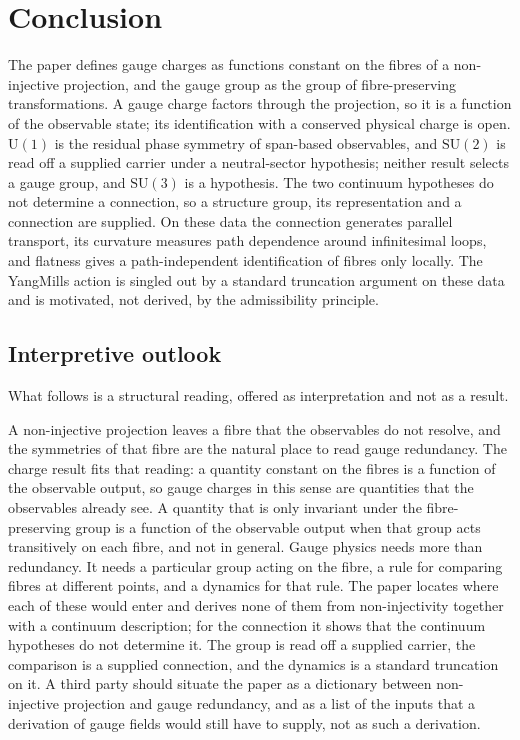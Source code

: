 \documentclass[11pt,a4paper]{article}
\begin{document}
  \section{Conclusion}
  \label{sec:conclusion}

    The paper defines gauge charges as functions constant on the fibres of a non-injective
    projection, and the gauge group as the group of fibre-preserving transformations.
    A gauge charge factors through the projection, so it is a function of the observable state;
    its identification with a conserved physical charge is open.
    $\mathrm{U}(1)$ is the residual phase symmetry of span-based observables, and $\mathrm{SU}(2)$
    is read off a supplied carrier under a neutral-sector hypothesis; neither result selects a gauge
    group, and $\mathrm{SU}(3)$ is a hypothesis.
    The two continuum hypotheses do not determine a connection, so a structure group, its
    representation and a connection are supplied.
    On these data the connection generates parallel transport, its curvature measures path
    dependence around infinitesimal loops, and flatness gives a path-independent identification of
    fibres only locally.
    The Yang\textendash Mills action is singled out by a standard truncation argument on these data
    and is motivated, not derived, by the admissibility principle.

  \subsection*{Interpretive outlook}

    What follows is a structural reading, offered as interpretation and not as a result.

    A non-injective projection leaves a fibre that the observables do not resolve, and the
    symmetries of that fibre are the natural place to read gauge redundancy.
    The charge result fits that reading: a quantity constant on the fibres is a function of the
    observable output, so gauge charges in this sense are quantities that the observables already see.
    A quantity that is only invariant under the fibre-preserving group is a function of the observable
    output when that group acts transitively on each fibre, and not in general.
    Gauge physics needs more than redundancy.
    It needs a particular group acting on the fibre, a rule for comparing fibres at different points,
    and a dynamics for that rule.
    The paper locates where each of these would enter and derives none of them from non-injectivity
    together with a continuum description; for the connection it shows that the continuum hypotheses
    do not determine it.
    The group is read off a supplied carrier,
    the comparison is a supplied connection, and the dynamics is a standard truncation on it.
    A third party should situate the paper as a dictionary between non-injective projection and
    gauge redundancy, and as a list of the inputs that a derivation of gauge fields would still have
    to supply, not as such a derivation.
\end{document}
